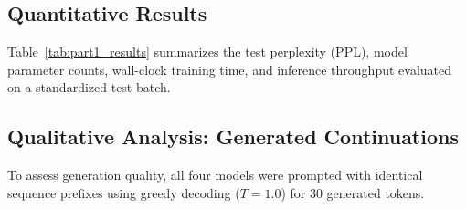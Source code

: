 \documentclass[10pt,twocolumn,3 authorization]{article}
\begin{document}
\subsection{Quantitative Results}
Table~\ref{tab:part1_results} summarizes the test perplexity (PPL), model parameter counts, wall-clock training time, and inference throughput evaluated on a standardized test batch.

\begin{table}[htbp]
\centering
\caption{Part I Language Model Comparison on WikiText-2.}
\label{tab:part1_results}
\end{table}

\subsection{Qualitative Analysis: Generated Continuations}
To assess generation quality, all four models were prompted with identical sequence prefixes using greedy decoding ($T=1.0$) for 30 generated tokens.

\begin{table}[htbp]
\centering
\caption{Sample Text Continuations from Common Prompts.}
\label{tab:generations}
\end{table}
\end{document}

